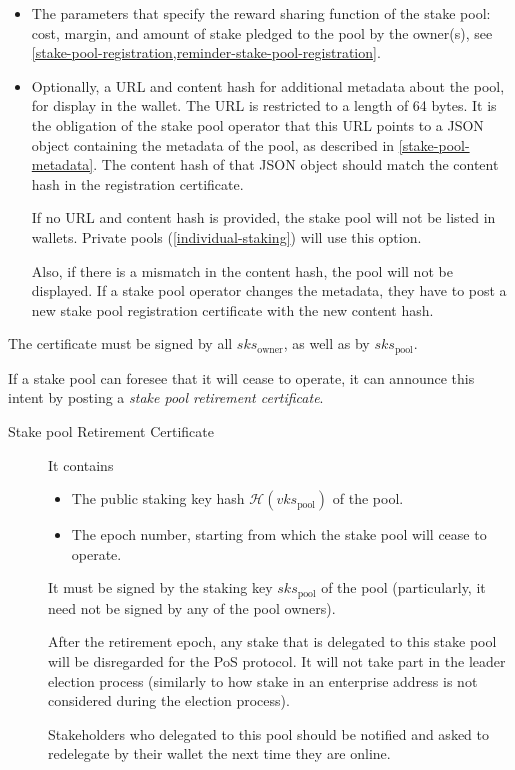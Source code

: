 \documentclass[11pt,a4paper,dvipsnames,twosided]{article}
\begin{document}
\begin{description}
\begin{itemize}
\item
  The parameters that specify the reward sharing function of the stake
  pool: cost, margin, and amount of stake pledged to the pool by the
  owner(s), see \cref{stake-pool-registration,reminder-stake-pool-registration}.

\item
  Optionally, a URL and content hash for additional metadata about the pool, for
  display in the wallet. The URL is restricted to a length of 64 bytes. It is
  the obligation of the stake pool operator that this URL points to a JSON
  object containing the metadata of the pool, as described in
  \cref{stake-pool-metadata}. The content hash of that JSON object should match
  the content hash in the registration certificate.

  If no URL and content hash is provided, the stake pool will not be listed in
  wallets. Private pools (\cref{individual-staking}) will use this option.

  Also, if there is a mismatch in the content hash, the pool will not be
  displayed. If a stake pool operator changes the metadata, they have to post a
  new stake pool registration certificate with the new content hash.
\end{itemize}

The certificate must be signed by all \(sks_\text{owner}\), as well as
by \(sks_\text{pool}\).

\end{description}

If a stake pool can foresee that it will cease to operate, it can
announce this intent by posting a \emph{stake pool retirement
certificate}.

\begin{description}
\item[Stake pool Retirement Certificate]
It contains

\begin{itemize}
\item
  The public staking key hash \(\mathcal{H}(vks_\text{pool})\) of the
  pool.
\item
  The epoch number, starting from which the stake pool will cease to
  operate.
\end{itemize}

It must be signed by the staking key \(sks_\text{pool}\) of the pool
(particularly, it need not be signed by any of the pool owners).

After the retirement epoch, any stake that is delegated to this stake
pool will be disregarded for the PoS protocol. It will not take part in
the leader election process (similarly to how stake in an enterprise
address is not considered during the election process).

Stakeholders who delegated to this pool should be notified and asked to
redelegate by their wallet the next time they are online.
\end{description}
\end{document}
